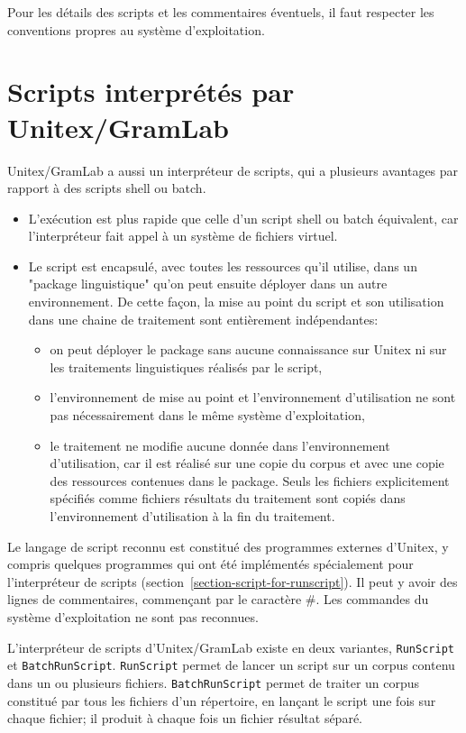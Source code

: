 \noindent Pour les détails des scripts et les commentaires éventuels, il faut respecter les conventions
propres au système d'exploitation.

\section{Scripts interprétés par Unitex/GramLab}
\label{section-unitex-scripts}

Unitex/GramLab a aussi un interpréteur de scripts, qui a plusieurs avantages par rapport à des scripts
shell ou batch.
\begin{itemize}
    \item L'exécution est plus rapide que celle d'un script shell ou batch équivalent, car l'interpréteur fait
appel à un système de fichiers virtuel.
    \item Le script est encapsulé, avec toutes les ressources qu'il utilise, dans un "package linguistique"
qu'on peut ensuite déployer dans un autre environnement. De cette façon, la mise au point du script
et son utilisation dans une chaine de traitement sont entièrement indépendantes:
\begin{itemize}
    \item on peut déployer le package sans aucune connaissance sur Unitex ni sur les traitements
linguistiques réalisés par le script,
    \item l'environnement de mise au point et l'environnement d'utilisation ne sont pas nécessairement
dans le même système d'exploitation,
    \item le traitement ne modifie aucune donnée dans l'environnement d'utilisation, car il est réalisé
sur une copie du corpus et avec une copie des ressources contenues dans le package. Seuls les fichiers
explicitement spécifiés comme fichiers résultats du traitement sont copiés dans l'environnement
d'utilisation à la fin du traitement.
\end{itemize}
\end{itemize}

\noindent Le langage de script reconnu est constitué des programmes externes d'Unitex, y compris quelques programmes qui ont été implémentés spécialement pour l'interpréteur de scripts
(section~\ref{section-script-for-runscript}). Il peut y avoir des lignes de commentaires, commençant
par le caractère \#. Les commandes du système d'exploitation ne sont pas reconnues.

\bigskip
\noindent L'interpréteur de scripts d'Unitex/GramLab existe en deux variantes, \verb$RunScript$ et
\verb$BatchRunScript$. \verb$RunScript$ permet de lancer un script sur un corpus contenu dans un
ou plusieurs fichiers. \verb$BatchRunScript$ permet de traiter un corpus constitué par tous les fichiers
d'un répertoire, en lançant le script une fois sur chaque fichier; il produit à chaque fois un fichier résultat
séparé.


